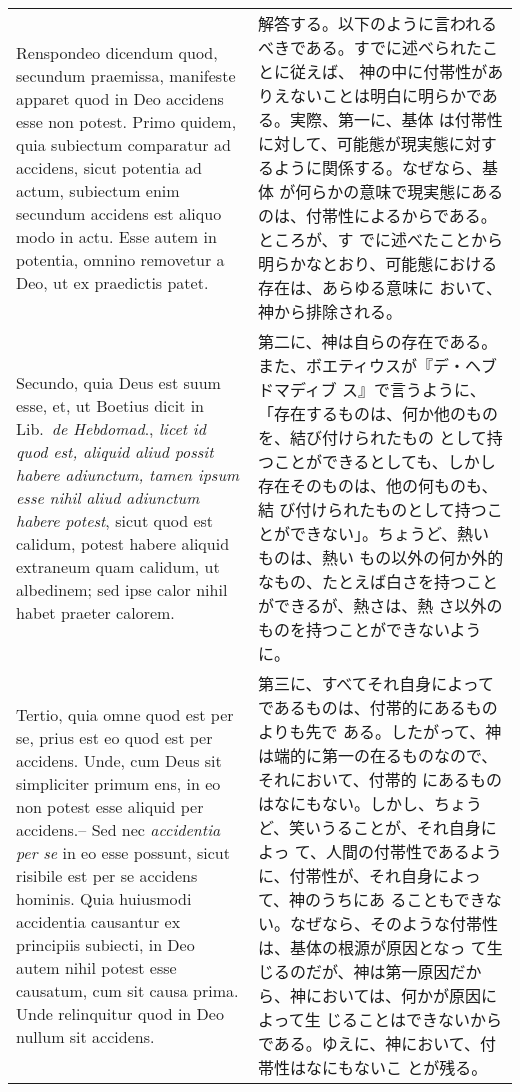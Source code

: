 \documentclass[10pt]{jsarticle}
\begin{document}
\begin{longtable}{p{21em}p{21em}}
Renspondeo dicendum quod, secundum praemissa, manifeste apparet quod
in Deo accidens esse non potest.  Primo quidem, quia subiectum
comparatur ad accidens, sicut potentia ad actum, subiectum enim
secundum accidens est aliquo modo in actu.  Esse autem in potentia,
omnino removetur a Deo, ut ex praedictis patet.

&

解答する。以下のように言われるべきである。すでに述べられたことに従えば、
神の中に付帯性がありえないことは明白に明らかである。実際、第一に、基体
は付帯性に対して、可能態が現実態に対するように関係する。なぜなら、基体
が何らかの意味で現実態にあるのは、付帯性によるからである。ところが、す
でに述べたことから明らかなとおり、可能態における存在は、あらゆる意味に
おいて、神から排除される。


\\

Secundo, quia Deus est suum esse, et, ut Boetius dicit in
Lib.~{\itshape de Hebdomad}., {\itshape licet id quod est, aliquid
aliud possit habere adiunctum, tamen ipsum esse nihil aliud adiunctum
habere potest}, sicut quod est calidum, potest habere aliquid
extraneum quam calidum, ut albedinem; sed ipse calor nihil habet
praeter calorem.

&

第二に、神は自らの存在である。また、ボエティウスが『デ・ヘブドマディブ
ス』で言うように、「存在するものは、何か他のものを、結び付けられたもの
として持つことができるとしても、しかし存在そのものは、他の何ものも、結
び付けられたものとして持つことができない」。ちょうど、熱いものは、熱い
もの以外の何か外的なもの、たとえば白さを持つことができるが、熱さは、熱
さ以外のものを持つことができないように。

\\

Tertio, quia omne quod est per se, prius est eo quod est per accidens.
Unde, cum Deus sit simpliciter primum ens, in eo non potest esse aliquid
per accidens.-- Sed nec {\itshape accidentia per se} in eo esse possunt,
sicut risibile est per se accidens hominis.  Quia huiusmodi accidentia
causantur ex principiis subiecti, in Deo autem nihil potest esse
causatum, cum sit causa prima. Unde relinquitur quod in Deo nullum sit
accidens.  

&

第三に、すべてそれ自身によってであるものは、付帯的にあるものよりも先で
ある。したがって、神は端的に第一の在るものなので、それにおいて、付帯的
にあるものはなにもない。しかし、ちょうど、笑いうることが、それ自身によっ
て、人間の付帯性であるように、付帯性が、それ自身によって、神のうちにあ
ることもできない。なぜなら、そのような付帯性は、基体の根源が原因となっ
て生じるのだが、神は第一原因だから、神においては、何かが原因によって生
じることはできないからである。ゆえに、神において、付帯性はなにもないこ
とが残る。



\end{longtable}
\end{document}
